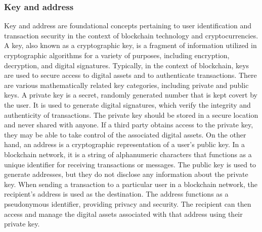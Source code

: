 \documentclass[../../Main.tex]{subfiles}
\begin{document}
\subsubsection{Key and address}
\label{section:2.1.3.1}
Key and address are foundational concepts pertaining to user identification and transaction security in the context of blockchain technology and cryptocurrencies. A key, also known as a cryptographic key, is a fragment of information utilized in cryptographic algorithms for a variety of purposes, including encryption, decryption, and digital signatures. Typically, in the context of blockchain, keys are used to secure access to digital assets and to authenticate transactions. There are various mathematically related key categories, including private and public keys. A private key is a secret, randomly generated number that is kept covert by the user. It is used to generate digital signatures, which verify the integrity and authenticity of transactions. The private key should be stored in a secure location and never shared with anyone. If a third party obtains access to the private key, they may be able to take control of the associated digital assets. On the other hand, an address is a cryptographic representation of a user's public key. In a blockchain network, it is a string of alphanumeric characters that functions as a unique identifier for receiving transactions or messages. The public key is used to generate addresses, but they do not disclose any information about the private key. When sending a transaction to a particular user in a blockchain network, the recipient's address is used as the destination. The address functions as a pseudonymous identifier, providing privacy and security. The recipient can then access and manage the digital assets associated with that address using their private key.
\end{document}
